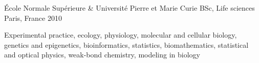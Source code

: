 \begin{cventries}
\cventry
    {École Normale Supérieure \& Université Pierre et Marie Curie} %
    {BSc, Life sciences} %
    {Paris, France} %
    {2010} %
    {
      \begin{cvitems} %
			\item Experimental practice, ecology, physiology, molecular and cellular biology, genetics and epigenetics, bioinformatics, statistics, biomathematics, statistical and optical physics, weak-bond chemistry, modeling in biology
      \end{cvitems}
    }  
\end{cventries}